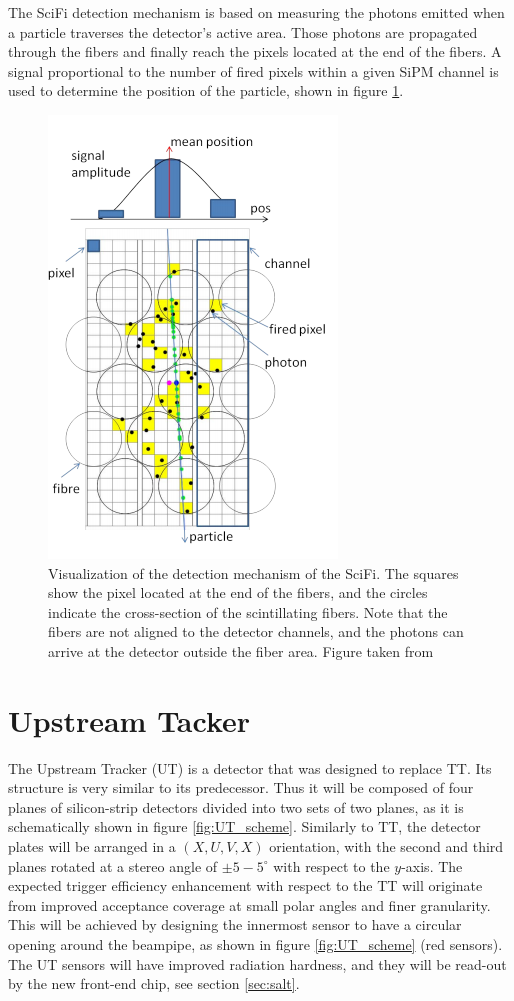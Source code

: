 The SciFi detection mechanism is based on measuring the photons emitted when a particle traverses the detector's active area. Those photons are propagated through the fibers and finally reach the pixels located at the end of the fibers. A signal proportional to the number of fired pixels within a given SiPM channel is used to determine the position of the particle, shown in figure \ref{fig:SciFI_idea}. 


\begin{figure}[!h]
\centering
\includegraphics[scale=0.5]{figures/SciFi_idea.PNG}
\caption{Visualization of the detection mechanism of the SciFi. The squares show the pixel located at the end of the fibers, and the circles indicate the cross-section of the scintillating fibers. Note that the fibers are not aligned to the detector channels, and the photons can arrive at the detector outside the fiber area.  Figure taken from \cite{upgrade_tracker_tdr}
\label{fig:SciFI_idea}}
\end{figure}

 
 \section{Upstream Tacker}
 
 The Upstream Tracker (UT) is a detector that was designed to replace TT. Its structure is very similar to its predecessor. Thus it will be composed of four planes of silicon-strip detectors divided into two sets of two planes, as it is schematically shown in figure \ref{fig:UT_scheme}. Similarly to TT, the detector plates will be arranged in a $(X, U, V, X)$ orientation, with the second and third planes rotated at a stereo angle of $\pm5-5^{\circ}$ with respect to the $y$-axis. 
The expected trigger efficiency enhancement with respect to the TT will originate from improved acceptance coverage at small polar angles and finer granularity.  This will be achieved by designing the innermost sensor to have a circular opening around the beampipe, as shown in figure \ref{fig:UT_scheme} (red sensors). The UT sensors will have improved radiation hardness, and they will be read-out by the new front-end chip, see section \ref{sec:salt}. 
 
